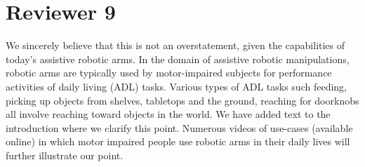 \documentclass[a4paper,twoside,11pt]{reviewresponse}
\begin{document}



\clearpage
\section{Reviewer 9}


We sincerely believe that this is not an overstatement, given the 
capabilities of today's assistive robotic arms. In the domain of assistive robotic manipulations,  robotic arms are typically used by motor-impaired subjects for performance activities of daily living (ADL) tasks. Various types of ADL tasks such feeding, picking up objects from shelves, tabletops and the ground, reaching for doorknobs all involve reaching toward objects in the world. We have added text to the introduction where we clarify this point. Numerous videos of use-cases (available online) in which motor impaired people use robotic arms in their daily lives will further illustrate our point. 

\end{document}
